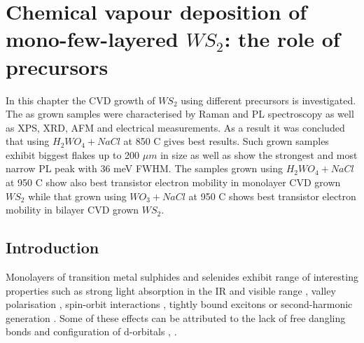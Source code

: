 \chapter{Chemical vapour deposition of mono-few-layered $WS_2$: the role of precursors}
\label{cha:WS2}

In this chapter the CVD growth of $WS_2$ using different precursors is investigated. The as grown samples were characterised by Raman and PL spectroscopy as well as XPS, XRD, AFM and electrical measurements. As a result it was concluded that using $H_2WO_4 + NaCl$ at 850 {\degree}C gives best results. Such grown samples exhibit biggest flakes up to 200 $\mu m$ in size as well as show the strongest and most narrow PL peak with 36 meV FWHM. The samples grown using $H_2WO_4 + NaCl$ at 950 {\degree}C show also best transistor electron mobility in monolayer CVD grown $WS_2$ while that grown using $WO_3 + NaCl$ at 950 {\degree}C shows best transistor electron mobility in bilayer CVD grown $WS_2$. 

\section{Introduction}
	
Monolayers of transition metal sulphides and selenides exhibit range of interesting properties such as strong light absorption in the IR and visible range \cite{AtomicallyThinMoS2ANewDirect-GapSemiconductor}\cite{ExtraordinarySunlightAbsorptionAndOneNanometerThickPhotovoltaicsUsingTwo-DimensionalMonolayerMaterials}\cite{EvolutionOfElectronicStructureInAtomicallyThinSheetsOfWS2AndWSe2}, valley polarisation \cite{ControlOfValleyPolarizationInMonolayerMoS2ByOpticalHelicity} \cite{ValleyPolarizationInMoS2MonolayersByOpticalPumping}, spin-orbit interactions \cite{CoupledSpinAndValleyPhysicsInMonolayersOfMoS2AndOtherGroup-VIDichalcogenides}\cite{GiantSpin-orbit-inducedSpinSplittingInTwo-dimensionalTransition-metalDichalcogenideSemiconductors}, tightly bound excitons \cite{Mak2012} or second-harmonic generation \cite{ProbingSymmetryPropertiesOfFew-LayerMoS2Andh-BNByOpticalSecond-HarmonicGeneration}. Some of these effects can be attributed to the lack of free dangling bonds and configuration of d-orbitals \cite{TheTransitionMetalDichalcogenidesDiscussionAndInterpretationOfTheObservedOpticalElectricalAndStructuralProperties}, \cite{ElectronicPropertiesOfMoS2Nanoparticles}.

